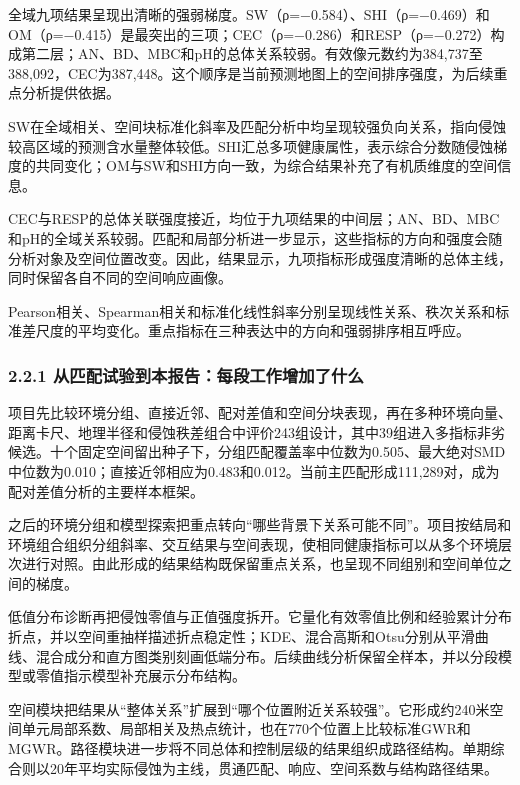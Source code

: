 \documentclass[
  11pt,
  a4paper,
]{ctexart}
\begin{document}
全域九项结果呈现出清晰的强弱梯度。SW（ρ=−0.584）、SHI（ρ=−0.469）和OM（ρ=−0.415）是最突出的三项；CEC（ρ=−0.286）和RESP（ρ=−0.272）构成第二层；AN、BD、MBC和pH的总体关系较弱。有效像元数约为384,737至388,092，CEC为387,448。这个顺序是当前预测地图上的空间排序强度，为后续重点分析提供依据。

SW在全域相关、空间块标准化斜率及匹配分析中均呈现较强负向关系，指向侵蚀较高区域的预测含水量整体较低。SHI汇总多项健康属性，表示综合分数随侵蚀梯度的共同变化；OM与SW和SHI方向一致，为综合结果补充了有机质维度的空间信息。

CEC与RESP的总体关联强度接近，均位于九项结果的中间层；AN、BD、MBC和pH的全域关系较弱。匹配和局部分析进一步显示，这些指标的方向和强度会随分析对象及空间位置改变。因此，结果显示，九项指标形成强度清晰的总体主线，同时保留各自不同的空间响应画像。

Pearson相关、Spearman相关和标准化线性斜率分别呈现线性关系、秩次关系和标准差尺度的平均变化。重点指标在三种表达中的方向和强弱排序相互呼应。

\hypertarget{ux4eceux5339ux914dux8bd5ux9a8cux5230ux672cux62a5ux544aux6bcfux6bb5ux5de5ux4f5cux589eux52a0ux4e86ux4ec0ux4e48}{%
\subsubsection{2.2.1
从匹配试验到本报告：每段工作增加了什么}\label{ux4eceux5339ux914dux8bd5ux9a8cux5230ux672cux62a5ux544aux6bcfux6bb5ux5de5ux4f5cux589eux52a0ux4e86ux4ec0ux4e48}}

项目先比较环境分组、直接近邻、配对差值和空间分块表现，再在多种环境向量、距离卡尺、地理半径和侵蚀秩差组合中评价243组设计，其中39组进入多指标非劣候选。十个固定空间留出种子下，分组匹配覆盖率中位数为0.505、最大绝对SMD中位数为0.010；直接近邻相应为0.483和0.012。当前主匹配形成111,289对，成为配对差值分析的主要样本框架。

之后的环境分组和模型探索把重点转向``哪些背景下关系可能不同''。项目按结局和环境组合组织分组斜率、交互结果与空间表现，使相同健康指标可以从多个环境层次进行对照。由此形成的结果结构既保留重点关系，也呈现不同组别和空间单位之间的梯度。

低值分布诊断再把侵蚀零值与正值强度拆开。它量化有效零值比例和经验累计分布折点，并以空间重抽样描述折点稳定性；KDE、混合高斯和Otsu分别从平滑曲线、混合成分和直方图类别刻画低端分布。后续曲线分析保留全样本，并以分段模型或零值指示模型补充展示分布结构。

空间模块把结果从``整体关系''扩展到``哪个位置附近关系较强''。它形成约240米空间单元局部系数、局部相关及热点统计，也在770个位置上比较标准GWR和MGWR。路径模块进一步将不同总体和控制层级的结果组织成路径结构。单期综合则以20年平均实际侵蚀为主线，贯通匹配、响应、空间系数与结构路径结果。
\end{document}
